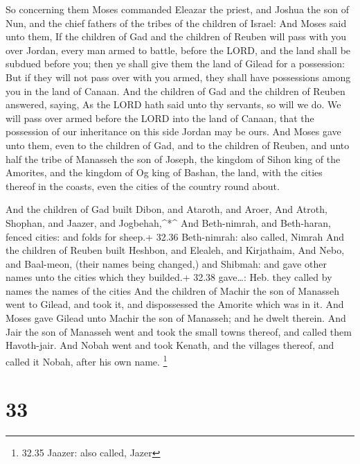  So concerning them Moses commanded Eleazar the priest, and
Joshua the son of Nun, and the chief fathers of the tribes of the
children of Israel:  And Moses said unto them, If the
children of Gad and the children of Reuben will pass with you over
Jordan, every man armed to battle, before the LORD, and the land shall
be subdued before you; then ye shall give them the land of Gilead for a
possession:  But if they will not pass over with you armed,
they shall have possessions among you in the land of Canaan.
 And the children of Gad and the children of Reuben
answered, saying, As the LORD hath said unto thy servants, so will we
do.  We will pass over armed before the LORD into the land
of Canaan, that the possession of our inheritance on this side Jordan
may be ours.  And Moses gave unto them, even to the
children of Gad, and to the children of Reuben, and unto half the tribe
of Manasseh the son of Joseph, the kingdom of Sihon king of the
Amorites, and the kingdom of Og king of Bashan, the land, with the
cities thereof in the coasts, even the cities of the country round
about.

 And the children of Gad built Dibon, and Ataroth, and
Aroer,  And Atroth, Shophan, and Jaazer, and
Jogbehah,\^{}*\^{}  And Beth-nimrah, and Beth-haran, fenced
cities: and folds for sheep.+ 32.36 Beth-nimrah: also called, Nimrah
 And the children of Reuben built Heshbon, and Elealeh, and
Kirjathaim,  And Nebo, and Baal-meon, (their names being
changed,) and Shibmah: and gave other names unto the cities which they
builded.+ 32.38 gave\ldots: Heb. they called by names the names of the
cities  And the children of Machir the son of Manasseh went
to Gilead, and took it, and dispossessed the Amorite which was in it.
 And Moses gave Gilead unto Machir the son of Manasseh; and
he dwelt therein.  And Jair the son of Manasseh went and
took the small towns thereof, and called them Havoth-jair. 
And Nobah went and took Kenath, and the villages thereof, and called it
Nobah, after his own name. \footnote{32.35 Jaazer: also called, Jazer}

\hypertarget{section-32}{%
\section{33}\label{section-32}}

